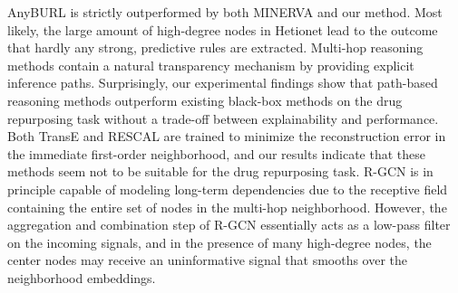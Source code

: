 \documentclass{article}
\begin{document}
AnyBURL is strictly outperformed by both MINERVA and our method. Most likely, the large amount of high-degree nodes in Hetionet lead to the outcome that hardly any strong, predictive rules are extracted. %
Multi-hop reasoning methods contain a natural transparency mechanism by providing explicit inference  paths. 
Surprisingly, our experimental findings show that path-based reasoning methods outperform existing black-box methods on the drug repurposing task without a trade-off between explainability and performance. 
Both TransE and RESCAL are trained to minimize the reconstruction error in the immediate first-order neighborhood,
and our results indicate that these methods 
seem not to be suitable for the drug repurposing task.
R-GCN is in principle capable of modeling long-term dependencies due to the receptive field containing the entire set of nodes in the multi-hop neighborhood. However, the aggregation and combination step of R-GCN essentially acts as a low-pass filter on the incoming signals, and 
in the presence of many high-degree nodes, 
the center nodes may receive an uninformative signal that smooths over the neighborhood embeddings. 
\end{document}
